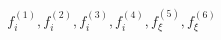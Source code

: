 \begin{equation} 
f^{{(1)}}_{i} , f^{{(2)}}_{i} , f^{{(3)}}_{i} , f^{{(4)}}_{i} , f^{{(5)}}_{{\xi}} , f^{{(6)}}_{{\xi}}
 \end{equation}